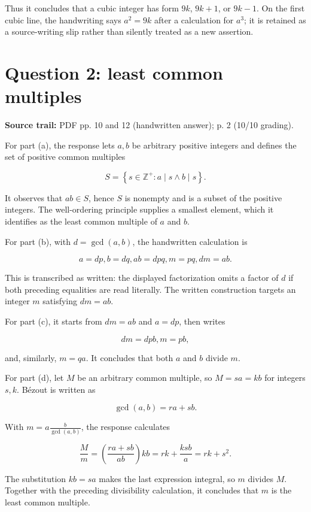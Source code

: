 Thus it concludes that a cubic integer has form \(9k\), \(9k + 1\), or \(9k - 1\). On the first cubic line, the handwriting says \(a^{2} = 9k\) after a calculation for \(a^{3}\); it is retained as a source-writing slip rather than silently treated as a new assertion.

\section{Question 2: least common multiples}

\textbf{Source trail:} PDF pp. 10 and 12 (handwritten answer); p. 2 (10/10 grading).

For part (a), the response lets \(a,b\) be arbitrary positive integers and defines the set of positive common multiples

\[S = \left\{ {s \in \mathbb{Z}^{+}:a \mid s \land b \mid s} \right\}.\]

It observes that \(ab \in S\), hence \(S\) is nonempty and is a subset of the positive integers. The well-ordering principle supplies a smallest element, which it identifies as the least common multiple of \(a\) and \(b\).

For part (b), with \(d = \gcd\left( {a,b} \right)\), the handwritten calculation is

\[a = dp,b = dq,ab = dpq,m = pq,dm = ab.\]

This is transcribed as written: the displayed factorization omits a factor of \(d\) if both preceding equalities are read literally. The written construction targets an integer \(m\) satisfying \(dm = ab\).

For part (c), it starts from \(dm = ab\) and \(a = dp\), then writes

\[dm = dpb,m = pb,\]

and, similarly, \(m = qa\). It concludes that both \(a\) and \(b\) divide \(m\).

For part (d), let \(M\) be an arbitrary common multiple, so \(M = sa = kb\) for integers \(s,k\). Bézout is written as

\[\gcd\left( {a,b} \right) = ra + sb.\]

With \(m = a\frac{b}{\gcd\left( {a,b} \right)}\), the response calculates

\[\frac{M}{m} = \left( \frac{ra + sb}{ab} \right)kb = rk + \frac{ksb}{a} = rk + s^{2}.\]

The substitution \(kb = sa\) makes the last expression integral, so \(m\) divides \(M\). Together with the preceding divisibility calculation, it concludes that \(m\) is the least common multiple.

